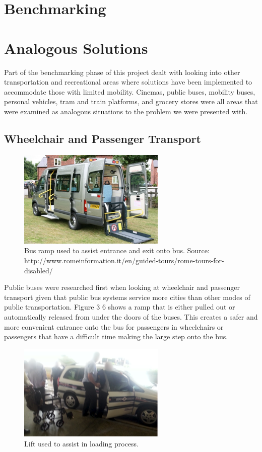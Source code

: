 \section{Benchmarking}
\section*{Analogous Solutions}
Part of the benchmarking phase of this project dealt with looking into other transportation and recreational areas where solutions have been implemented to accommodate those with limited mobility.  Cinemas, public buses, mobility buses, personal vehicles, tram and train platforms, and grocery stores were all areas that were examined as analogous situations to the problem we were presented with.

\subsection{Wheelchair and Passenger Transport}

\begin{figure}[h]
  \centering
     \includegraphics[width=7cm]{images/image042}
   \caption{Bus ramp used to assist entrance and exit onto bus. Source: http://www.romeinformation.it/en/guided-tours/rome-tours-for-disabled/}
  \label{fig:42}
\end{figure}

Public buses were researched first when looking at wheelchair and passenger transport given that public bus systems service more cities than other modes of public transportation.  Figure 3 6 shows a ramp that is either pulled out or automatically released from under the doors of the buses.  This creates a safer and more convenient entrance onto the bus for passengers in wheelchairs or passengers that have a difficult time making the large step onto the bus. 

\begin{figure}[h]
  \centering
     \includegraphics[width=7cm]{images/image039}
   \caption{Lift used to assist in loading process.}%
  \label{fig:39}
\end{figure}

